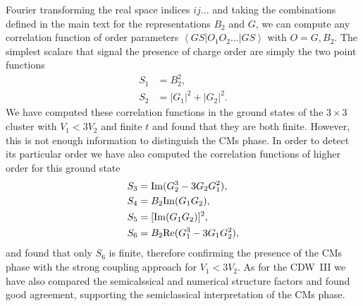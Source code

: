 \documentclass[aps,prx,10pt,twocolumn,floatfix,superscriptaddress,showpacs,numerical,footinbib]{revtex4-1}
\begin{document}
%
Fourier transforming the real space indices $ij\ldots$ and taking the combinations defined in the main text for the representations $B_2$ and $G$, we can compute any correlation function of order parameters $\left< GS \right| O_1 O_2 \ldots \left| GS \right> $ with $O = G, B_2$. 
%
The simplest scalars that signal the presence of charge order are simply the two point functions
\begin{align}
S_1 &= B_2^2, \\
S_2 &= |G_1|^2+|G_2|^2.
\end{align}
We have computed these correlation functions in the ground states of the $3\times3$ cluster with $V_1<3V_2$ and finite $t$ and found that they are both finite. 
%
However, this is not enough information to distinguish the CMs phase. 
%
In order to detect its particular order we have also computed the correlation functions of higher order for this ground state
%
\begin{align}
S_3 &= {\rm Im}(G_2^3-3G_2 G_1^2),  \\
S_4 &= B_2 {\rm Im}(G_1G_2), \\
S_5 &= [{\rm Im}(G_1G_2)]^2, \\
S_6 &= B_2{\rm Re}(G_1^3-3G_1 G_2^2),
\end{align}
%
and found that only $S_6$ is finite, therefore confirming the presence of the CMs phase with the strong coupling approach for $V_1<3V_2$. 
%
As for the CDW~III we have also compared the semicalssical and numerical structure factors and found good agreement, supporting the semiclassical interpretation of the CMs phase.


\end{document}
